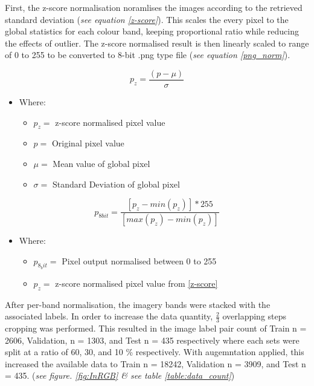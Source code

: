 \documentclass[11pt, a4paper, twoside]{report}
\begin{document}
First, the z-score normalisation noramlises the images according to the retrieved standard deviation (\textit{see equation \ref{z-score}}). This scales the every pixel to the global statistics for each colour band, keeping proportional ratio while reducing the effects of outlier. The z-score normalised result is then linearly scaled to range of 0 to 255 to be converted to 8-bit .png type file (\textit{see equation \ref{png_norm}}).

\begin{equation}
  \label{z-score}
  p_{z} = \frac{(p - \mu)}{\sigma}
\end{equation}

\begin{itemize}
  \item Where:
    \begin{itemize}
      \item $p_{z} =$ z-score normalised pixel value
      \item $p =$ Original pixel value
      \item $\mu =$ Mean value of global pixel
      \item $\sigma =$ Standard Deviation of global pixel
    \end{itemize}
\end{itemize}

\begin{equation}
  \label{png_norm}
  p_{8 bit} = \frac{[p_{z} - min(p_{z})] * 255}{[max(p_{z}) - min(p_{z})]}
\end{equation}

\begin{itemize}
  \item Where:
    \begin{itemize}
      \item $p_{8_bit} =$ Pixel output normalised between 0 to 255
      \item $p_{z} =$ z-score normalised pixel value from \ref{z-score}
    \end{itemize}
\end{itemize}

After per-band normalisation, the imagery bands were stacked with the associated labels. In order to increase the data quantity, $\frac{2}{3}$ overlapping steps cropping was performed. This resulted in the image label pair count of Train n = 2606, Validation, n = 1303, and Test n = 435 respectively where each sets were split at a ratio of 60, 30, and 10 \% respectively. With augemntation applied, this increased the available data to Train n = 18242, Validation n = 3909, and Test n = 435. (\textit{see figure. \ref{fig:InRGB} \& see table \ref{table:data_count}})\\\par
\end{document}

